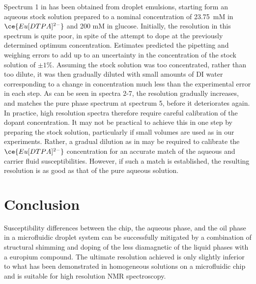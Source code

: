 Spectrum 1 in  has been obtained from
droplet emulsions, starting form an aqueous stock solution prepared to a nominal concentration
of 23.75~mM in $\ce{Eu[DTPA]^{2-}}$ and 200 mM in glucose.
Initially, the resolution in this spectrum is quite poor, in spite of
the attempt to dope at the previously determined optimum concentration. Estimates predicted
the pipetting and weighing errors to add up to an uncertainty in the concentration of the
stock solution of $\pm 1\%$.
Assuming the stock solution was too concentrated, rather than too dilute, it was
then gradually diluted with small amounts of DI water corresponding
to a change in concentration much less than the experimental error in each step.
As can be seen in spectra 2-7, the resolution gradually increases, and matches
the pure phase spectrum at spectrum 5, before it deteriorates again.
In practice, high resolution spectra therefore require careful calibration of the dopant
concentration. It may not be practical to achieve this in one step by preparing the stock
solution, particularly if small volumes are used as in our
experiments. Rather, a gradual dilution as in  may be required
to calibrate the $\ce{Eu[DTPA]^{2-}}$ concentration for an accurate match of
the aqueous and carrier fluid susceptibilities. However, if such a match is established,
the resulting resolution is as good as that of the pure aqueous solution.

\section{Conclusion}

Susceptibility differences between the chip,
the aqueous phase, and the oil phase in a microfluidic droplet system can
be successfully mitigated by a combination of structural shimming and
doping of the less diamagnetic of the liquid phases with a europium compound.
The ultimate resolution achieved is only slightly inferior to what has been
demonstrated in homogeneous solutions on a microfluidic chip and is suitable for high
resolution NMR spectroscopy.
